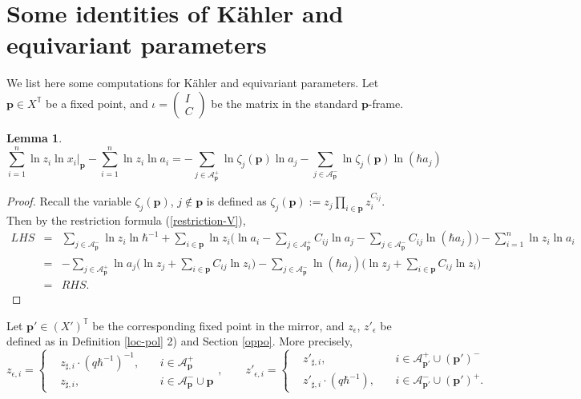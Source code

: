 \documentclass[10pt]{amsart}
\theoremstyle{definition}
\def\ben{\begin{eqnarray*}}
\def\een{\end{eqnarray*}}
\def\TT{\mathbb{T}}
\newcommand{\bp}{\mathbf{p}}
\newcommand{\cA}{\mathcal{A}}
\theoremstyle{definition}
\numberwithin{equation}{section}
\theoremstyle{Theorem}
\newtheorem{Lemma}[Definition]{Lemma}
\begin{document}
\appendix







\section{Some identities of K\"ahler and equivariant parameters}

We list here some computations for K\"ahler and equivariant parameters. Let $\bp \in X^\TT$ be a fixed point, and $\iota = \begin{pmatrix}
I \\
C
\end{pmatrix}$ be the matrix in the standard $\bp$-frame.

\begin{Lemma}
$$
\sum_{i=1}^n \ln z_i \ln x_i |_\bp - \sum_{i=1}^n \ln z_i \ln a_i  = -\sum_{j\in \cA_\bp^+ } \ln \zeta_j (\bp) \ln a_j - \sum_{j\in \cA_\bp^- } \ln \zeta_j (\bp) \ln (\hbar a_j)
$$
\end{Lemma}

\begin{proof}
Recall the variable $\zeta_j (\bp)$, $j\not\in \bp$ is defined as $\zeta_j (\bp) := z_j \prod_{i\in \bp} z_i^{C_{ij}}$. Then by the restriction formula (\ref{restriction-V}),
\ben
LHS &=& \sum_{j\in \cA_\bp^-} \ln z_i \ln \hbar^{-1} + \sum_{i\in \bp} \ln z_i \Big( \ln a_i - \sum_{j\in \cA_\bp^+} C_{ij} \ln a_j - \sum_{j\in \cA_\bp^-} C_{ij} \ln (\hbar a_j) \Big) - \sum_{i=1}^n \ln z_i \ln a_i \\
&=& -\sum_{j\in \cA_\bp^+} \ln a_j \Big( \ln z_j + \sum_{i\in \bp} C_{ij} \ln z_i \Big) - \sum_{j\in \cA_\bp^-} \ln (\hbar a_j) \Big( \ln z_j + \sum_{i\in \bp} C_{ij} \ln z_i \Big) \\
&=& RHS.
\een
\end{proof}

Let $\bp' \in (X')^\TT$ be the corresponding fixed point in the mirror, and $z_\epsilon$, $z'_\epsilon$ be defined as in Definition \ref{loc-pol} 2) and Section \ref{oppo}. More precisely,
$$
z_{\epsilon, i} = \left\{ \begin{aligned}
& z_{\sharp, i} \cdot (q\hbar^{-1} )^{-1} , && \   i \in \cA_\bp^+  \\
& z_{\sharp, i} , && \   i \in \cA_\bp^- \cup \bp
\end{aligned}\right. , \qquad z'_{\epsilon, i} = \left\{ \begin{aligned}
& z'_{\sharp, i} , && \  i \in \cA_{\bp'}^+ \cup (\bp')^- \\
& z'_{\sharp, i} \cdot (q\hbar^{-1} ) , && \ i \in  \cA_{\bp'}^- \cup (\bp')^+  .
\end{aligned}\right.
$$
\end{document}
